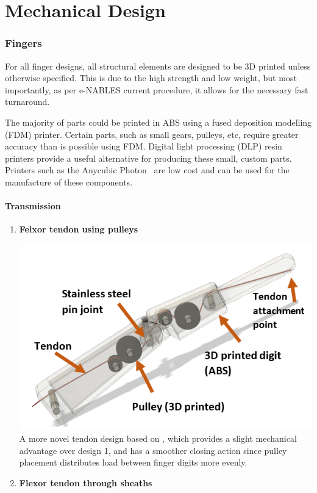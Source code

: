 \documentclass[11pt,3p]{report}
\begin{document}
\part{Mechanical Design}
\begin{multicols}{2}

	\section{Fingers}
For all finger designs, all structural elements are designed to be 3D printed unless otherwise specified. This is due to the high strength and low weight, but most importantly, as per e-NABLES current procedure, it allows for the necessary fast turnaround.

The majority of parts could be printed in ABS using a fused deposition modelling (FDM) printer. Certain parts, such as small gears, pulleys, etc, require greater accuracy than is possible using FDM. Digital light processing (DLP) resin printers provide a useful alternative for producing these small, custom parts. Printers such as the Anycubic Photon~\cite{photon} are low cost and can be used for the manufacture of these components.
	
		\subsection{Transmission}
		
		
			\begin{enumerate}[noitemsep]
						\item \textbf{Felxor tendon using pulleys} {
							
				\includegraphics[scale=0.5]{pulley.PNG}
				A more novel tendon design based on \cite{mottardunderactuated}, which provides a slight mechanical advantage over design 1, and has a smoother closing action since pulley placement distributes load between finger digits more evenly. 
			}
						\vfill\null
			\columnbreak
			\item \textbf{Flexor tendon through sheaths} {

}
\end{enumerate}
\end{multicols}
\end{document}
